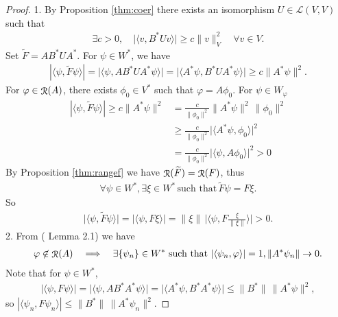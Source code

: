 \documentclass[a4paper,12pt]{article}
\theoremstyle{definition}
\DeclareMathOperator\img{\EuScript{R}}
\begin{document}
\begin{proof}
  1. By Proposition \ref{thm:coer} there exists an isomorphism $U\in\mathcal{L}(V, V)$ such that 
  \begin{align}
    \exists c > 0, \quad\bigl|\langle v, B^*Uv\rangle\bigr|\geqslant c\|v\|_V^2\quad\forall v\in V. 
  \end{align}
  Set $\widetilde{F} = AB^*UA^*$. For $\psi\in W^*$, we have
  \begin{align}
    \left|\langle\psi, \widetilde{F}\psi\rangle\right|=\bigl|\langle\psi, AB^*UA^*\psi\rangle\bigr|=\bigl|\langle A^*\psi, B^*UA^*\psi\rangle\bigr|\geqslant c\|A^*\psi\|^2.
  \end{align}
  For $\varphi\in\img(A)$, there exists $\phi_0\in V^*$ such that $\varphi=A\phi_0$. For $\psi\in W_\varphi$    
  \begin{align*}
    \left|\langle\psi, \widetilde{F}\psi\rangle\right|\geqslant c\|A^*\psi\|^2&=\frac{c}{\|\phi_0\|^2}\|A^*\psi\|^2\,\|\phi_0\|^2 \\
    &\geqslant\frac{c}{\|\phi_0\|^2}\bigl|\langle A^*\psi,\phi_0\rangle\bigr|^2 \\
    &=\frac{c}{\|\phi_0\|^2}\bigl|\langle \psi,A\phi_0\rangle\bigr|^2 > 0
  \end{align*}
  By Proposition \ref{thm:rangef} we have $\img(\widetilde{F})=\img(F)$, thus
  \begin{align}\label{eq:equalrange}
    \forall\psi\in W^*, \exists\xi\in W^*\,\text{such that}\,\widetilde{F}\psi=F\xi.
  \end{align}
  So 
  \begin{align*}
    \bigl|\langle\psi, \widetilde{F}\psi\rangle\bigr|=\bigl|\langle\psi, F\xi\rangle\bigr|=\|\xi\|\,\bigl|\langle\psi, F\frac{\xi}{\|\xi\|}\rangle\bigr| > 0.
  \end{align*}
  2. From (\citet{nachman} Lemma 2.1) we have 
  \begin{align*}
    \varphi\not\in\img(A)\quad\Longrightarrow\quad\exists\{\psi_n\}\in W^*\text{ such that }|\langle\psi_n,\varphi\rangle|=1, \|A^*\psi_n\|\to 0.
  \end{align*}
  Note that for $\psi\in W^*$,
  \begin{align*}
    \left|\langle\psi, F\psi\rangle\right|=\bigl|\langle\psi, AB^*A^*\psi\rangle\bigr|=\bigl|\langle A^*\psi, B^*A^*\psi\rangle\bigr|\leqslant\|B^*\|\,\|A^*\psi\|^2,
  \end{align*}
  so $\left|\langle\psi_n, F\psi_n\rangle\right|\leqslant\|B^*\|\,\|A^*\psi_n\|^2$.
\end{proof}


\nocite{*}


\end{document}
